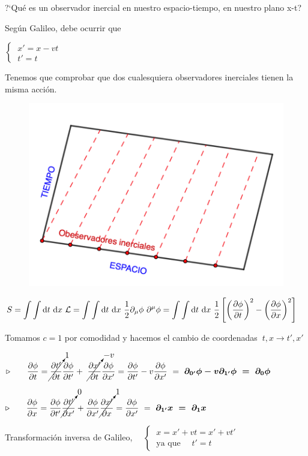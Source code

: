 \begin{multicols}{2}
?`Qué es un observador inercial en nuestro espacio-tiempo, en nuestro plano x-t?

Según Galileo, debe ocurrir que

$\begin{cases}
\ x'=x-vt \\ \ t'=t	
\end{cases}$

Tenemos que comprobar que dos cualesquiera observadores inerciales tienen la misma acción.

	\begin{figure}[H]
	\centering
	\includegraphics[width=.45\textwidth]{imagenes/img29-04.png}
\end{figure}
\end{multicols}

$S=\displaystyle \int \int \dd t \ \dd x \ \mathcal L = \int \int \dd t \ \dd x \ \dfrac 1 2 \partial_\mu \phi \ \partial^\mu \phi = \int \int \dd t \ \dd x \ \dfrac 1 2 \left[ \left( \pdv{\phi}{t} \right)^2-\left( \pdv{\phi}{x} \right)^2 \right] $

Tomamos $c=1$ por comodidad y hacemos el cambio de coordenadas $\ t,x \to t',x'$

$\triangleright \qquad \displaystyle \pdv{\phi}{t}=
\displaystyle  \cancelto{1}{\pdv{t'}{t}} \pdv{\phi}{t'}+\ \cancelto{-v}{\pdv{x'}{t}}\displaystyle \pdv{\phi}{x'}= \pdv{\phi}{t'}-v\pdv{\phi}{x'}\ = \ \boldsymbol{ \partial_{0'}\phi-v\partial_{1'}\phi \ = \ \partial_0 \phi }$

$\triangleright \qquad \displaystyle 
\pdv{\phi}{x}=
\pdv{\phi}{t'} \cancelto{0}{\pdv{t'}{x'}} + \pdv{\phi}{x'} \cancelto{1}{\pdv{x'}{x}}=
\pdv{\phi}{x'} \ = \ \boldsymbol{ \partial_{1'} x \ = \ \partial_1 x}$

\begin{small}\textcolor{gris}{Transformación inversa de Galileo, $\quad \begin{cases}
\ x=x'+vt=x'+vt' \\ \ \text{ya que } \quad  t'=t	
\end{cases}$} \end{small}

